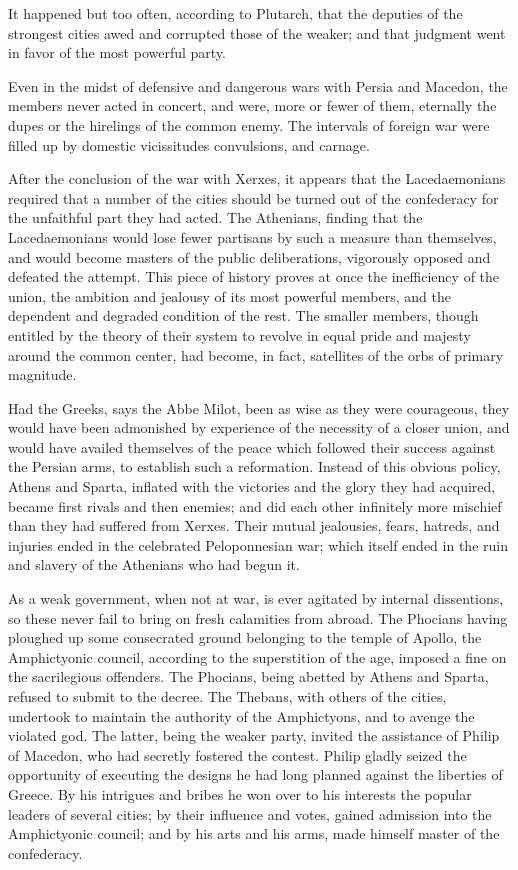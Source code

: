 It happened but too often, according to Plutarch, that the deputies of the strongest cities awed and corrupted those of the weaker; and that judgment went in favor of the most powerful party.

Even in the midst of defensive and dangerous wars with Persia and Macedon, the members never acted in concert, and were, more or fewer of them, eternally the dupes or the hirelings of the common enemy. The intervals of foreign war were filled up by domestic vicissitudes convulsions, and carnage.

After the conclusion of the war with Xerxes, it appears that the Lacedaemonians required that a number of the cities should be turned out of the confederacy for the unfaithful part they had acted. The Athenians, finding that the Lacedaemonians would lose fewer partisans by such a measure than themselves, and would become masters of the public deliberations, vigorously opposed and defeated the attempt. This piece of history proves at once the inefficiency of the union, the ambition and jealousy of its most powerful members, and the dependent and degraded condition of the rest. The smaller members, though entitled by the theory of their system to revolve in equal pride and majesty around the common center, had become, in fact, satellites of the orbs of primary magnitude.

Had the Greeks, says the Abbe Milot, been as wise as they were courageous, they would have been admonished by experience of the necessity of a closer union, and would have availed themselves of the peace which followed their success against the Persian arms, to establish such a reformation. Instead of this obvious policy, Athens and Sparta, inflated with the victories and the glory they had acquired, became first rivals and then enemies; and did each other infinitely more mischief than they had suffered from Xerxes. Their mutual jealousies, fears, hatreds, and injuries ended in the celebrated Peloponnesian war; which itself ended in the ruin and slavery of the Athenians who had begun it.

As a weak government, when not at war, is ever agitated by internal dissentions, so these never fail to bring on fresh calamities from abroad. The Phocians having ploughed up some consecrated ground belonging to the temple of Apollo, the Amphictyonic council, according to the superstition of the age, imposed a fine on the sacrilegious offenders. The Phocians, being abetted by Athens and Sparta, refused to submit to the decree. The Thebans, with others of the cities, undertook to maintain the authority of the Amphictyons, and to avenge the violated god. The latter, being the weaker party, invited the assistance of Philip of Macedon, who had secretly fostered the contest. Philip gladly seized the opportunity of executing the designs he had long planned against the liberties of Greece. By his intrigues and bribes he won over to his interests the popular leaders of several cities; by their influence and votes, gained admission into the Amphictyonic council; and by his arts and his arms, made himself master of the confederacy.

